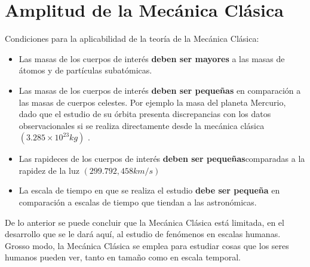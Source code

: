 \documentclass[/home/hernan/Documentos/Apuntes_mecanica_teorica/main.tex]{subfiles}
\begin{document}
    \section{Amplitud de la Mecánica Clásica}


    Condiciones para la aplicabilidad de la teoría de la Mecánica Clásica:

    \begin{itemize}
        \item Las masas de los cuerpos de interés \textbf{deben ser mayores} a las masas de átomos y de partículas subatómicas.
        \item Las masas de los cuerpos de interés \textbf{deben ser pequeñas} en comparación a las masas de cuerpos celestes. Por ejemplo la masa del planeta Mercurio, dado que el estudio de su órbita presenta discrepancias con los datos observacionales si se realiza directamente desde la mecánica clásica $\left(3.285 \times 10^{23} kg\right)$ .
        \item Las rapideces de los cuerpos de interés  \textbf{deben ser pequeñas}comparadas a la rapidez de la luz $\left(299.792,458 km/s\right)$
        \item  La escala de tiempo en que se realiza el estudio \textbf{debe ser pequeña} en comparación a escalas de tiempo que tiendan a las astronómicas.
    \end{itemize}

    De lo anterior se puede concluir que la Mecánica Clásica está limitada, en el desarrollo que se le dará aquí, al estudio de fenómenos en escalas humanas. Grosso modo, la Mecánica Clásica se emplea para estudiar cosas que los seres humanos pueden ver, tanto en tamaño como en escala temporal. 
\end{document}

